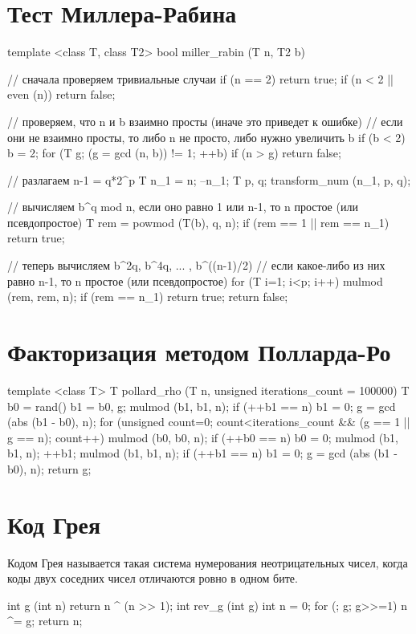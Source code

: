 \documentclass[12pt, titlepage]{article}
\begin{document}
\section{Тест Миллера-Рабина}
\begin{cppcode}
template <class T, class T2>
bool miller_rabin (T n, T2 b)
{
    // сначала проверяем тривиальные случаи
    if (n == 2)
        return true;
    if (n < 2 || even (n))
        return false;

    // проверяем, что n и b взаимно просты (иначе это приведет к ошибке)
    // если они не взаимно просты, то либо n не просто, либо нужно увеличить b
    if (b < 2)
        b = 2;
    for (T g; (g = gcd (n, b)) != 1; ++b)
        if (n > g)
            return false;

    // разлагаем n-1 = q*2^p
    T n_1 = n;
    --n_1;
    T p, q;
    transform_num (n_1, p, q);

    // вычисляем b^q mod n, если оно равно 1 или n-1, то n простое (или псевдопростое)
    T rem = powmod (T(b), q, n);
    if (rem == 1 || rem == n_1)
        return true;

    // теперь вычисляем b^2q, b^4q, ... , b^((n-1)/2)
    // если какое-либо из них равно n-1, то n простое (или псевдопростое)
    for (T i=1; i<p; i++)
    {
        mulmod (rem, rem, n);
        if (rem == n_1)
            return true;
    }
    return false;
}
\end{cppcode}

\section{Факторизация методом Полларда-Ро}
\begin{cppcode}
template <class T>
T pollard_rho (T n, unsigned iterations_count = 100000)
{
    T   b0 = rand() %
        b1 = b0,
        g;
    mulmod (b1, b1, n);
    if (++b1 == n)
        b1 = 0;
    g = gcd (abs (b1 - b0), n);
    for (unsigned count=0; count<iterations_count && (g == 1 || g == n); count++)
    {
        mulmod (b0, b0, n);
        if (++b0 == n)
            b0 = 0;
        mulmod (b1, b1, n);
        ++b1;
        mulmod (b1, b1, n);
        if (++b1 == n)
            b1 = 0;
        g = gcd (abs (b1 - b0), n);
    }
    return g;
}
\end{cppcode}


\section{Код Грея}
Кодом Грея называется такая система нумерования неотрицательных чисел, когда коды двух соседних чисел отличаются ровно в одном бите.
\begin{cppcode}
int g (int n) {
    return n ^ (n >> 1);
}
int rev_g (int g) {
    int n = 0;
    for (; g; g>>=1)
        n ^= g;
    return n;
}
\end{cppcode}
\end{document}
